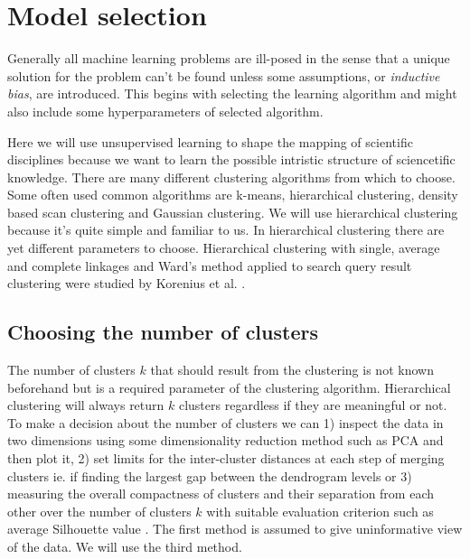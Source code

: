 \section{Model selection}
Generally all machine learning problems are ill-posed in the sense 
that a unique solution for the problem can't be found unless some
assumptions, or \emph{inductive bias}, are introduced. This begins 
with selecting the learning algorithm and might also include some
hyperparameters of selected algorithm.

Here we will use unsupervised learning to shape the mapping of 
scientific disciplines because we want to learn the possible 
intristic structure of sciencetific knowledge.  
There are many different clustering algorithms from which to 
choose. Some often used common algorithms are k-means, hierarchical
clustering, density based scan clustering and Gaussian clustering.
We will use hierarchical clustering because it's quite simple and 
familiar to us.
In hierarchical clustering there are yet different parameters to 
choose. 
Hierarchical clustering with single, average and complete linkages
and Ward's method applied to search query result clustering were 
studied by Korenius et al. \cite{korenius_hierarchical_2006}.

\subsection{Choosing the number of clusters}
The number of clusters $k$ that should result from the clustering is
not known beforehand but is a required parameter of the
clustering algorithm. Hierarchical clustering will always return 
$k$ clusters regardless if they are meaningful or not. To make a
decision about the number of clusters we can 1) inspect the data in 
two dimensions using some dimensionality reduction method such as 
PCA and then plot it, 2) set limits for the inter-cluster 
distances at each step of merging clusters ie. if finding the 
largest gap between the dendrogram levels or 3) measuring the 
overall compactness of clusters and their separation from each 
other over the number of clusters $k$ with suitable evaluation
criterion such as average Silhouette value 
\cite{alpaydin2004introduction} \cite{calinski_dendrite_1974} 
\cite{rousseeuw_silhouettes:_1987}. The first method is assumed to 
give uninformative view of the data. We will use the third method.





